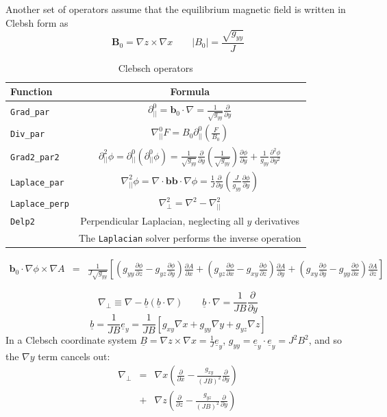 \documentclass[12pt]{article}
\newcommand{\code}[1]{\texttt{#1}}
\newcommand{\deriv}[2]{\ensuremath{\frac{\partial #1}{\partial #2}}}
\begin{document}
Another set of operators assume that the equilibrium magnetic field is written
in Clebsh form as 
\[
\mathbf{B}_0 = \nabla z\times\nabla x \qquad \left|B_0\right| = \frac{\sqrt{g_{yy}}}{J}
\]

\begin{table}[htb!]
\centering
\caption{Clebsch operators}
\label{tab:clebsch_operators}
\begin{tabular}{l c}
\hline
Function & Formula \\
\hline
\code{Grad\_par} & $\displaystyle\partial^0_{||} = \mathbf{b}_0\cdot\nabla = \frac{1}{\sqrt{g_{yy}}}\deriv{}{y}$ \\
\code{Div\_par} & $\displaystyle \nabla^0_{||}F = B_0\partial^0_{||}\left(\frac{F}{B_0}\right)$ \\
\code{Grad2\_par2} & $\displaystyle \partial^2_{||}\phi = \partial^0_{||}\left(\partial^0_{||}\phi\right) = \frac{1}{\sqrt{g_{yy}}}\deriv{}{y}\left(\frac{1}{\sqrt{g_{yy}}}\right)\deriv{\phi}{y} + \frac{1}{g_{yy}}\frac{\partial^2\phi}{\partial y^2}$ \\
\code{Laplace\_par} & $\displaystyle \nabla_{||}^2\phi = \nabla\cdot\mathbf{b}\mathbf{b}\cdot\nabla\phi = \frac{1}{J}\deriv{}{y}\left(\frac{J}{g_{yy}}\deriv{\phi}{y}\right)$ \\
\code{Laplace\_perp} & $\displaystyle \nabla_\perp^2 = \nabla^2 - \nabla_{||}^2$ \\
\code{Delp2} & Perpendicular Laplacian, neglecting all $y$ derivatives \\
             & The \code{Laplacian} solver performs the inverse operation \\
\hline
\end{tabular}
\end{table}

\begin{eqnarray*}
\mathbf{b}_0\cdot\nabla\phi\times\nabla A &=& \frac{1}{J\sqrt{g_{yy}}}\left[\left(g_{yy}\deriv{\phi}{z} - g_{yz}\deriv{\phi}{y}\right)\deriv{A}{x} + \left(g_{yz}\deriv{\phi}{x} - g_{xy}\deriv{\phi}{z}\right)\deriv{A}{y} + \left(g_{xy}\deriv{\phi}{y} - g_{yy}\deriv{\phi}{x}\right)\deriv{A}{z}\right]
\end{eqnarray*}

\[
\nabla_\perp \equiv \nabla - \underline{b}\left(\underline{b}\cdot\nabla\right) \qquad \underline{b}\cdot\nabla = \frac{1}{JB}\frac{\partial}{\partial y}
\]
\[
\underline{b} = \frac{1}{JB}\underline{e}_y = \frac{1}{JB}\left[g_{xy}\nabla x + g_{yy}\nabla y + g_{yz}\nabla z\right]
\]
In a Clebsch coordinate system $\underline{B} = \nabla z \times \nabla x = \frac{1}{J}\underline{e}_y$, $g_{yy} = \underline{e}_y\cdot\underline{e}_y = J^2B^2$, and so the $\nabla y$ term cancels out:
\begin{eqnarray*}
\nabla_\perp &=& \nabla x\left(\deriv{}{x} - \frac{g_{xy}}{\left(JB\right)^2}\deriv{}{y}\right) \\
&+& \nabla z\left(\deriv{}{z} - \frac{g_{yz}}{\left(JB\right)^2}\deriv{}{y}\right)
\end{eqnarray*}
\end{document}
